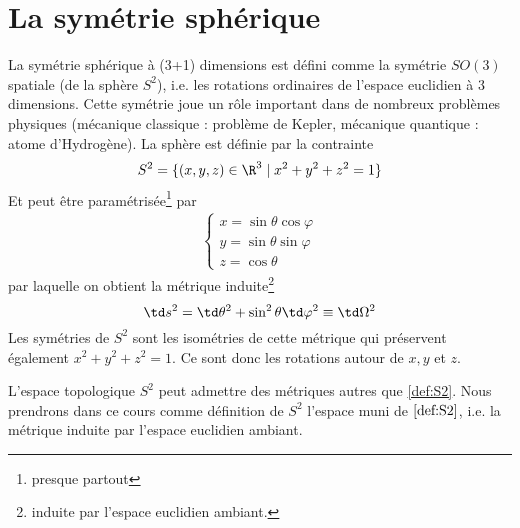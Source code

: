 \section{La symétrie sphérique}
La symétrie sphérique à (3+1) dimensions est défini comme la symétrie $SO(3)$ spatiale (de la sphère $S^2$), i.e. les rotations ordinaires de l'espace euclidien à 3 dimensions. Cette symétrie joue un rôle important dans de nombreux problèmes physiques (mécanique classique : problème de Kepler, mécanique quantique : atome d'Hydrogène). La sphère est définie par la contrainte
\begin{equation}
    S^2 = \{ (x,y,z) \in \R^3 \mid x^2 +y^2 +z^2 = 1 \}
\end{equation}
Et peut être paramétrisée\footnote{presque partout} par
\begin{align}
    \left\{ 
    \begin{array}{l}
        x = \sin \theta \cos\varphi \\
        y = \sin \theta \sin \varphi \\
        z = \cos \theta
    \end{array}
    \right.
\end{align}
par laquelle on obtient la métrique induite\footnote{induite par l'espace euclidien ambiant.}
\begin{equation}
    \label{def:S2}
    \td s^2 = \td \theta ^2 + \sin ^2 \theta \td \varphi^2 \equiv \td \Omega^2
\end{equation}
Les symétries de $S^2$ sont les isométries de cette métrique qui préservent également $x^2 + y^2 +z^2 =1$. Ce sont donc les rotations autour de $x, y$ et $z$. 
\begin{rmk}
    L'espace topologique $S^2$ peut admettre des métriques autres que \ref{def:S2}. Nous prendrons dans ce cours comme définition de $S^2$ l'espace muni de $\ref{def:S2}$, i.e. la métrique induite par l'espace euclidien ambiant.
\end{rmk}
